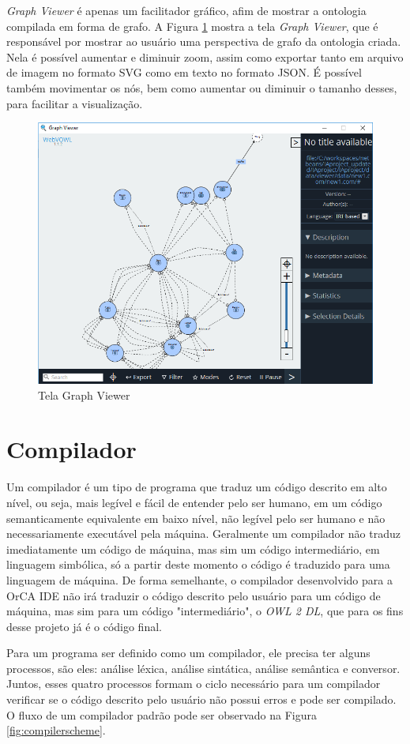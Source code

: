 \documentclass{bcc}
\begin{document}
\textit{Graph Viewer} é apenas um facilitador gráfico, afim de mostrar a ontologia compilada em forma de grafo. A Figura \ref{fig:telGraph} mostra a tela \textit{Graph Viewer}, que é responsável por mostrar ao usuário uma perspectiva de grafo da ontologia criada. Nela é possível aumentar e diminuir zoom, assim como exportar tanto em arquivo de imagem no formato SVG como em texto no formato JSON. É possível também movimentar os nós, bem como aumentar ou diminuir o tamanho desses, para facilitar a visualização.

\begin{figure}[H]
\centering
\includegraphics[width=.7\textwidth]{Figuras/tela_graph.png}
\caption{Tela Graph Viewer}
\label{fig:telGraph}
\end{figure}

\section{Compilador}

Um compilador é um tipo de programa que traduz um código descrito em alto nível, ou seja, mais legível e fácil de entender pelo ser humano, em um código semanticamente equivalente em baixo nível, não legível pelo ser humano e não necessariamente executável pela máquina. Geralmente um compilador não traduz imediatamente um código de máquina, mas sim um código intermediário, em linguagem simbólica, só a partir deste momento o código é traduzido para uma linguagem de máquina. De forma semelhante, o compilador desenvolvido para a OrCA IDE não irá traduzir o código descrito pelo usuário para um código de máquina, mas sim para um código "intermediário", o \textit{OWL 2 DL}, que para os fins desse projeto já é o código final.

Para um programa ser definido como um compilador, ele precisa ter alguns processos, são eles: análise léxica, análise sintática, análise semântica e conversor. Juntos, esses quatro processos formam  o ciclo necessário para um compilador verificar se o código descrito pelo usuário não possui erros e pode ser compilado. O fluxo de um compilador padrão pode ser observado na Figura \ref{fig:compilerscheme}.
\end{document}
